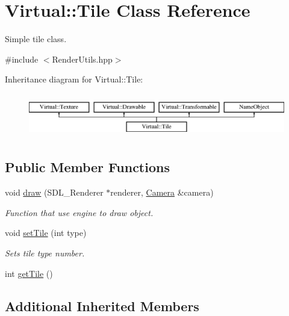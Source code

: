 \hypertarget{class_virtual_1_1_tile}{}\section{Virtual\+:\+:Tile Class Reference}
\label{class_virtual_1_1_tile}


Simple tile class.  




{\ttfamily \#include $<$Render\+Utils.\+hpp$>$}

Inheritance diagram for Virtual\+:\+:Tile\+:\begin{figure}[H]
\begin{center}
\leavevmode
\includegraphics[height=1.944445cm]{class_virtual_1_1_tile}
\end{center}
\end{figure}
\subsection*{Public Member Functions}
\begin{DoxyCompactItemize}
\item 
void \hyperlink{class_virtual_1_1_tile_ac9adb75122a87ec5efb5107b611ba226}{draw} (S\+D\+L\+\_\+\+Renderer $\ast$renderer, \hyperlink{class_virtual_1_1_camera}{Camera} \&camera)
\begin{DoxyCompactList}\small\item\em Function that use engine to draw object. \end{DoxyCompactList}\item 
void \hyperlink{class_virtual_1_1_tile_a7e275a90e1b528130445c8e053d4dc66}{set\+Tile} (int type)
\begin{DoxyCompactList}\small\item\em Sets tile type number. \end{DoxyCompactList}\item 
int \hyperlink{class_virtual_1_1_tile_ae535b36cb182c5376739a4d6cdb7306b}{get\+Tile} ()
\end{DoxyCompactItemize}
\subsection*{Additional Inherited Members}


